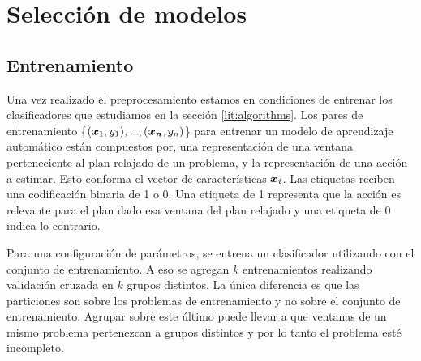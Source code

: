 \begin{table}[h!]
\centering
{}
 \caption{Ejemplos etiquetados a partir de un plan relajado y una acción}
 \label{tb:matrix_shape}
\end{table}

\section{Selección de modelos}
\label{method:model_selection}

\subsection{Entrenamiento}

Una vez realizado el preprocesamiento estamos en condiciones de entrenar los clasificadores que estudiamos en la sección \ref{lit:algorithms}. Los pares de entrenamiento \{$(\boldsymbol{x}_1, y_1), ..., (\boldsymbol{x_n}, y_n)$\} para entrenar un modelo de aprendizaje automático están compuestos por, una representación de una ventana perteneciente al plan relajado de un problema, y la representación de una acción a estimar. Esto conforma el vector de características $\boldsymbol{x}_i$. Las etiquetas reciben una codificación binaria de 1 o 0. Una etiqueta de 1 representa que la acción es relevante para el plan dado esa ventana del plan relajado y una etiqueta de 0 indica lo contrario.

Para una configuración de parámetros, se entrena un clasificador utilizando con el conjunto de entrenamiento. A eso se agregan $k$ entrenamientos realizando validación cruzada en $k$ grupos distintos. La única diferencia es que las particiones son sobre los problemas de entrenamiento y no sobre el conjunto de entrenamiento. Agrupar sobre este último puede llevar a que ventanas de un mismo problema pertenezcan a grupos distintos y por lo tanto el problema esté incompleto.

